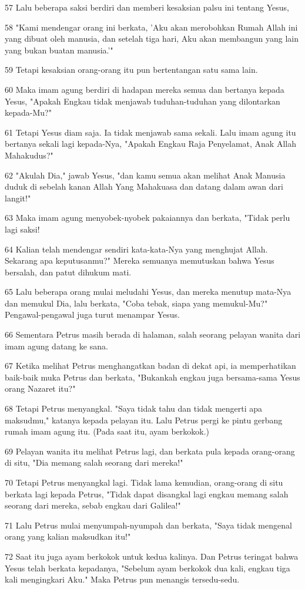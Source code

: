 \par 57 Lalu beberapa saksi berdiri dan memberi kesaksian palsu ini tentang Yesus,
\par 58 "Kami mendengar orang ini berkata, 'Aku akan merobohkan Rumah Allah ini yang dibuat oleh manusia, dan setelah tiga hari, Aku akan membangun yang lain yang bukan buatan manusia.'"
\par 59 Tetapi kesaksian orang-orang itu pun bertentangan satu sama lain.
\par 60 Maka imam agung berdiri di hadapan mereka semua dan bertanya kepada Yesus, "Apakah Engkau tidak menjawab tuduhan-tuduhan yang dilontarkan kepada-Mu?"
\par 61 Tetapi Yesus diam saja. Ia tidak menjawab sama sekali. Lalu imam agung itu bertanya sekali lagi kepada-Nya, "Apakah Engkau Raja Penyelamat, Anak Allah Mahakudus?"
\par 62 "Akulah Dia," jawab Yesus, "dan kamu semua akan melihat Anak Manusia duduk di sebelah kanan Allah Yang Mahakuasa dan datang dalam awan dari langit!"
\par 63 Maka imam agung menyobek-nyobek pakaiannya dan berkata, "Tidak perlu lagi saksi!
\par 64 Kalian telah mendengar sendiri kata-kata-Nya yang menghujat Allah. Sekarang apa keputusanmu?" Mereka semuanya memutuskan bahwa Yesus bersalah, dan patut dihukum mati.
\par 65 Lalu beberapa orang mulai meludahi Yesus, dan mereka menutup mata-Nya dan memukul Dia, lalu berkata, "Coba tebak, siapa yang memukul-Mu?" Pengawal-pengawal juga turut menampar Yesus.
\par 66 Sementara Petrus masih berada di halaman, salah seorang pelayan wanita dari imam agung datang ke sana.
\par 67 Ketika melihat Petrus menghangatkan badan di dekat api, ia memperhatikan baik-baik muka Petrus dan berkata, "Bukankah engkau juga bersama-sama Yesus orang Nazaret itu?"
\par 68 Tetapi Petrus menyangkal. "Saya tidak tahu dan tidak mengerti apa maksudmu," katanya kepada pelayan itu. Lalu Petrus pergi ke pintu gerbang rumah imam agung itu. (Pada saat itu, ayam berkokok.)
\par 69 Pelayan wanita itu melihat Petrus lagi, dan berkata pula kepada orang-orang di situ, "Dia memang salah seorang dari mereka!"
\par 70 Tetapi Petrus menyangkal lagi. Tidak lama kemudian, orang-orang di situ berkata lagi kepada Petrus, "Tidak dapat disangkal lagi engkau memang salah seorang dari mereka, sebab engkau dari Galilea!"
\par 71 Lalu Petrus mulai menyumpah-nyumpah dan berkata, "Saya tidak mengenal orang yang kalian maksudkan itu!"
\par 72 Saat itu juga ayam berkokok untuk kedua kalinya. Dan Petrus teringat bahwa Yesus telah berkata kepadanya, "Sebelum ayam berkokok dua kali, engkau tiga kali mengingkari Aku." Maka Petrus pun menangis tersedu-sedu.

